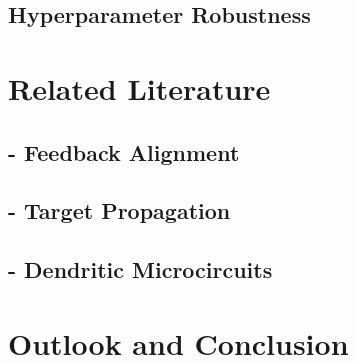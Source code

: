 \documentclass{article}
\theoremstyle{definition}
\begin{document}
\subsection*{Hyperparameter Robustness}

\section{Related Literature}

\subsection*{\citet{lillicrap2016} - Feedback Alignment}

\subsection*{\citet{bartunov2018} - Target Propagation}

\subsection*{\citet{sacramento2018} - Dendritic Microcircuits}


\section{Outlook and Conclusion}


\newpage
\setlength{\bibsep}{4pt plus 0.3ex}

{\footnotesize }
\end{document}
